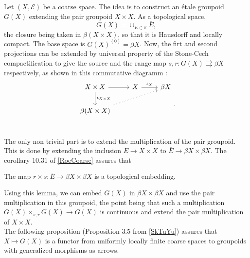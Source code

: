 Let $(X,\mathcal E)$ be a coarse space. The idea is to construct an étale groupoid $G(X)$ extending the pair groupoid $X\times X$. As a topological space, 
\[G(X)= \cup_{E\in \mathcal E} \overline{E},\]
the closure being taken in $\beta (X\times X)$, so that it is Hausdorff and locally compact. The base space is $G(X)^{(0)}=\beta X$. Now, the firt and second projections can be extended by universal property of the Stone-Cech compactification to give the source and the range map $s,r : G(X)\rightrightarrows \beta X$ respectively, as shown in this commutative diagramm :  
\[\begin{tikzcd}
X\times X \arrow{r}\arrow{d}{\iota_{X\times X}} &  X \arrow{r}{\iota_X} & \beta X \\
\beta (X\times X) \arrow[dotted]{urr} & & \\ 
\end{tikzcd}.\]

The only non trivial part is to extend the multiplication of the pair groupoid. This is done by extending the inclusion $E \rightarrow X\times X$ to $\overline{E} \rightarrow \beta X\times \beta X$. The corollary 10.31 of \ref{RoeCoarse} assures that 
\begin{lem}
The map $r\times s : \overline E \rightarrow \beta X\times \beta X$ is a topological embedding.
\end{lem}
Using this lemma, we can embed $G(X)$ in $\beta X\times \beta X$ and use the pair multiplication in this groupoid, the point being that such a multiplication $G(X)\times_{s,r} G(X) \rightarrow G(X)$ is continuous and extend the pair multiplication of $X\times X$.\\

The following proposition (Proposition $3.5$ from \ref{SkTuYu}) assures that $X\mapsto G(X)$ is a functor from uniformly locally finite coarse spaces to groupoids with generalized morphisms as arrows.\\

